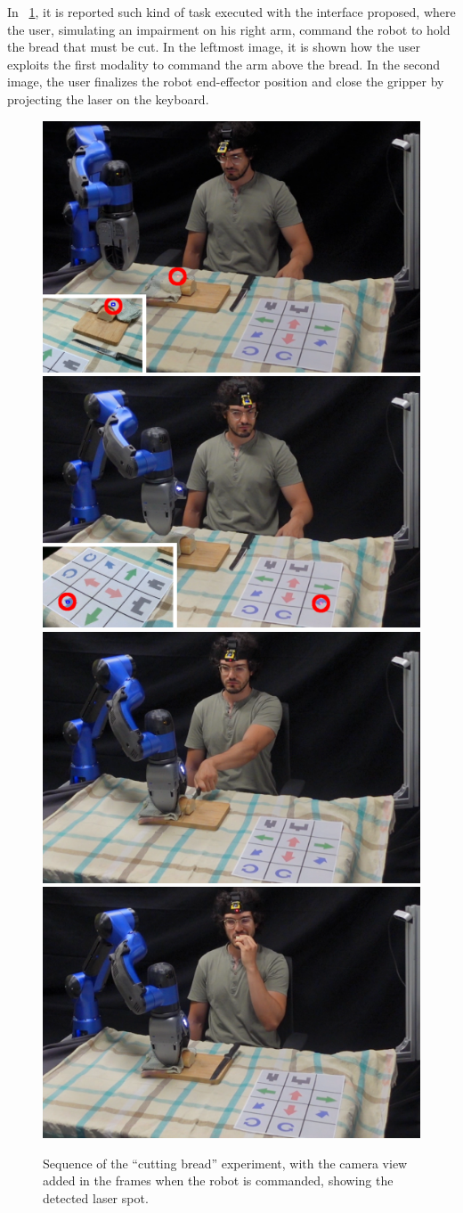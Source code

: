 In \figurename~\ref{fig:pane3-frames}, it is reported such kind of task executed with the interface proposed, where the user, simulating an impairment on his right arm, command the robot to hold the bread that must be cut. In the leftmost image, it is shown how the user exploits the first modality to command the arm above the bread. In the second image, the user finalizes the robot end-effector position and close the gripper by projecting the laser on the keyboard.

\begin{figure}[H]
	\centering
 	\includegraphics[width=0.22\linewidth]{img/pane-frame0edited.png}
	\includegraphics[width=0.22\linewidth]{img/pane-frame1edited.png}
	\includegraphics[width=0.22\linewidth]{img/pane-frame2edited.png}
	\includegraphics[width=0.22\linewidth]{img/pane-frame3edited.png}
	\caption{Sequence of the \enquote{cutting bread} experiment, with the camera view added in the frames when the robot is commanded, showing the detected laser spot.}
	\label{fig:pane3-frames}
\end{figure}

